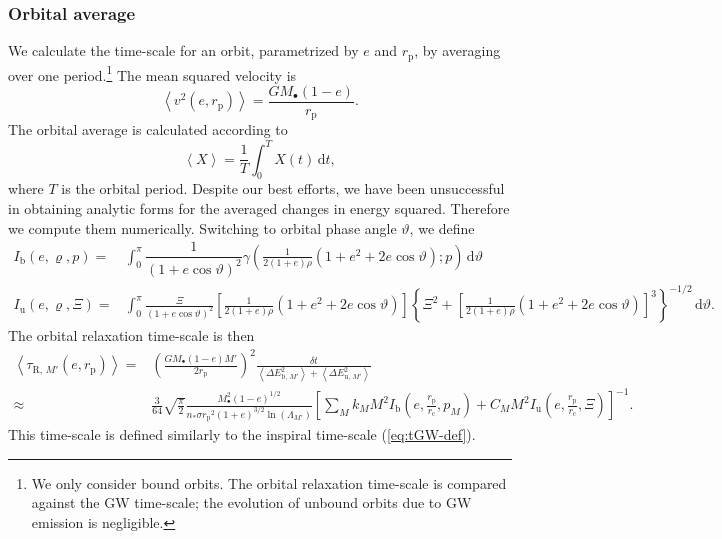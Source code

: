 \documentclass[useAMS,usedcolumn,usegraphicx,usenatbib]{mn2e}
\newcommand{\eqnref}[1]{(\ref{eq:#1})}
\newcommand{\sub}[1]{\ensuremath{_\mathrm{#1}}}
\newcommand{\dd}{\ensuremath{\mathrm{d}}}
\newcommand{\intd}[4]{\ensuremath{\displaystyle \int_{#1}^{#2}{#3}\,\dd{#4}}}
\newcommand{\recip}[1]{\ensuremath{\dfrac{1}{#1}}}
\begin{document}
\begin{onecolumn}
\subsubsection{Orbital average}\label{sec:orbital-ave}

We calculate the time-scale for an orbit, parametrized by $e$ and $r\sub{p}$, by averaging over one period.\footnote{We only consider bound orbits. The orbital relaxation time-scale is compared against the GW time-scale; the evolution of unbound orbits due to GW emission is negligible.} The mean squared velocity is
\begin{equation}
\left\langle v^2\left(e,r\sub{p}\right)\right\rangle = \frac{GM_\bullet(1 - e)}{r\sub{p}}.
\end{equation}
The orbital average is calculated according to \citep[section 2.2b]{Spitzer1987}
\begin{equation}
\left\langle X\right\rangle = \recip{T}\intd{0}{T}{X(t)}{t},
\end{equation}
where $T$ is the orbital period. Despite our best efforts, we have been unsuccessful in obtaining analytic forms for the averaged changes in energy squared. Therefore we compute them numerically. Switching to orbital phase angle $\vartheta$, we define
\begin{align}
I\sub{b}(e,\varrho,p) = {} & \intd{0}{\pi}{\recip{(1 + e \cos\vartheta)^2}\gamma\left(\frac{1}{2(1+e)\rho}\left(1+e^2+2e\cos\vartheta\right);p\right)}{\vartheta} \\
I\sub{u}(e,\varrho,\Xi) = {} & \intd{0}{\pi}{\frac{\Xi}{(1 + e \cos\vartheta)^2}\left[\frac{1}{2(1+e)\rho}\left(1+e^2+2e\cos\vartheta\right)\right]\left\{\Xi^2 + \left[\frac{1}{2(1+e)\rho}\left(1+e^2+2e\cos\vartheta\right)\right]^3\right\}^{-1/2}}{\vartheta}.
\end{align}
The orbital relaxation time-scale is then
\begin{align}
\left\langle\tau_{\mathrm{R},\,M'}\left(e,r\sub{p}\right)\right\rangle = {} & \left(\frac{GM_\bullet(1 - e)M'}{2r\sub{p}}\right)^2\frac{\delta t}{\left\langle\Delta E^2_{\mathrm{b},\,M'}\right\rangle + \left\langle\Delta E^2_{\mathrm{u},\,M'}\right\rangle} \\
 \approx {} & \frac{3}{64}\sqrt{\frac{\pi}{2}} \frac{M_\bullet^2(1 - e)^{1/2}}{n_\ast \sigma r\sub{p}^2(1 + e)^{3/2}\ln\left(\Lambda_{M'}\right)} \left[\sum_M k_M M^2 I\sub{b}\left(e,\frac{r\sub{p}}{r\sub{c}},p_M\right) + C_M M^2 I\sub{u}\left(e,\frac{r\sub{p}}{r\sub{c}},\Xi\right)\right]^{-1}.
\label{eq:orbital-relax}
\end{align}
This time-scale is defined similarly to the inspiral time-scale \eqnref{tGW-def}.


\end{onecolumn}
\end{document}
